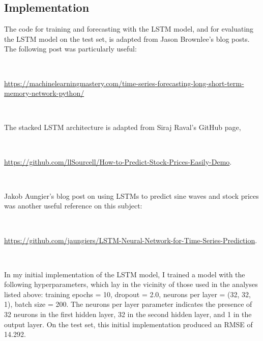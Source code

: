 \documentclass{article}
\begin{document}
\subsection{Implementation}


The code for training and forecasting with the LSTM model, and for evaluating the LSTM model on the test set, is adapted from Jason Brownlee's blog posts. The following post was particularly useful:

\

\noindent \url{https://machinelearningmastery.com/time-series-forecasting-long-short-term-memory-network-python/}

\

\noindent The stacked LSTM architecture is adapted from Siraj Raval's GitHub page,

\

\noindent \url{https://github.com/llSourcell/How-to-Predict-Stock-Prices-Easily-Demo}.

\

\noindent Jakob Aungier's blog post on using LSTMs to predict sine waves and stock prices was another useful reference on this subject:  

\

\noindent \url{https://github.com/jaungiers/LSTM-Neural-Network-for-Time-Series-Prediction}.

\

In my initial implementation of the LSTM model, I trained a model with the following hyperparameters, which lay in the vicinity of those used in the analyses listed above: training epochs = 10, dropout = 2.0, neurons per layer = (32, 32, 1), batch size = 200. The neurons per layer parameter indicates the presence of 32 neurons in the first hidden layer, 32 in the second hidden layer, and 1 in the output layer. On the test set, this initial implementation produced an RMSE of 14.292. 




\end{document}
